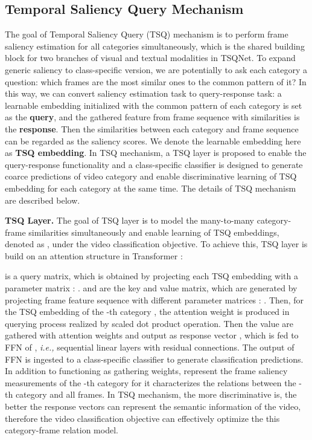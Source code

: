 \documentclass[runningheads]{llncs}
\begin{document}
\subsection{Temporal Saliency Query Mechanism}\label{tsq_mechanisim}
The goal of Temporal Saliency Query (TSQ) mechanism is to perform frame saliency estimation for all categories simultaneously, which is the shared building block for two branches of visual and textual modalities in TSQNet. To expand generic saliency to class-specific version, we are potentially to ask each category a question: 
which frames are the most similar ones to the common pattern of it?
In this way, we can convert saliency estimation task to query-response task: a learnable embedding initialized with the common pattern of each category is set as the \textbf{query}, and the gathered feature from frame sequence with similarities is the \textbf{response}. Then the similarities between each category and frame sequence can be regarded as the saliency scores. We denote the learnable embedding here as \textbf{TSQ embedding}. In TSQ mechanism, a TSQ layer is proposed to enable the query-response functionality and a class-specific classifier is designed to generate coarce predictions of video category and enable discriminative learning of TSQ embedding for each category at the same time. The details of TSQ mechanism are described below.

\noindent\textbf{TSQ Layer.}
The goal of TSQ layer is to model the many-to-many category-frame similarities simultaneously and enable learning of TSQ embeddings, denoted as , under the video classification objective. To achieve this, TSQ layer is build on an attention structure in Transformer \cite{transformer}:

 is a query matrix, which is obtained by projecting each TSQ embedding  with a parameter matrix : .
 and  are the key and value matrix, which are generated by projecting frame feature sequence  with different parameter matrices : .
Then, for the TSQ embedding of the -th category , the attention weight  is produced in querying process realized by scaled dot product operation. Then the value  are gathered with attention weights  and output as response vector , which is fed to FFN of \cite{transformer}, \emph{i.e.,} sequential linear layers with residual connections. The output of FFN is ingested to a class-specific classifier to generate classification predictions. In addition to functioning as gathering weights,  represent the frame saliency measurements of the -th category for it characterizes the relations between the -th category and all  frames. In TSQ mechanism, the more discriminative  is, the better the response vectors  can represent the semantic information of the video, therefore the video classification objective can effectively optimize the this category-frame relation model.
\end{document}
